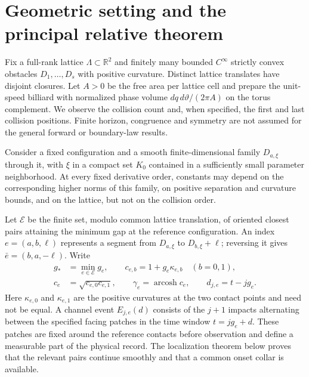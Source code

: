 \section{Geometric setting and the principal relative theorem}
\label{sec:v18-formal-setup}

Fix a full-rank lattice $\Lambda\subset\mathbb R^2$ and finitely many
bounded $C^\infty$ strictly convex obstacles $D_1,\ldots,D_s$ with
positive curvature. Distinct lattice translates have disjoint closures.
Let $A>0$ be the free area per lattice cell and prepare the unit-speed
billiard with normalized phase volume $dq\,d\vartheta/(2\pi A)$ on the
torus complement. We observe the collision count and, when specified, the
first and last collision positions. Finite horizon, congruence and symmetry
are not assumed for the general forward or boundary-law results.

Consider a fixed configuration and a smooth finite-dimensional family
$D_{a,\xi}$ through it, with $\xi$ in a compact set $K_0$ contained in a
sufficiently small parameter neighborhood. At every fixed derivative order,
constants may depend on the corresponding higher norms of this family, on
positive separation and curvature bounds, and on the lattice, but not on
the collision order.

Let $\mathcal E$ be the finite set, modulo common lattice translation, of
oriented closest pairs attaining the minimum gap at the reference
configuration. An index $e=(a,b,\ell)$ represents a segment from
$D_{a,\xi}$ to $D_{b,\xi}+\ell$; reversing it gives
$\bar e=(b,a,-\ell)$. Write
\begin{equation}\label{eq:g-general-data}
 \begin{split}
 g_*&=\min_{e\in\mathcal E}g_e,\qquad
 c_{e,b}=1+g_e\kappa_{e,b}\quad(b=0,1),\\
 c_e&=\sqrt{c_{e,0}c_{e,1}},\qquad
 \gamma_e=\operatorname{arcosh}c_e,
 \qquad d_{j,e}=t-jg_e.
 \end{split}
\end{equation}
Here $\kappa_{e,0}$ and $\kappa_{e,1}$ are the positive curvatures at the
two contact points and need not be equal. A channel event $E_{j,e}(d)$
consists of the $j+1$ impacts alternating between the specified facing
patches in the time window $t=jg_e+d$. These patches are fixed around the
reference contacts before observation and define a measurable part of the
physical record. The localization theorem below proves that the relevant
pairs continue smoothly and that a common onset collar is available.

